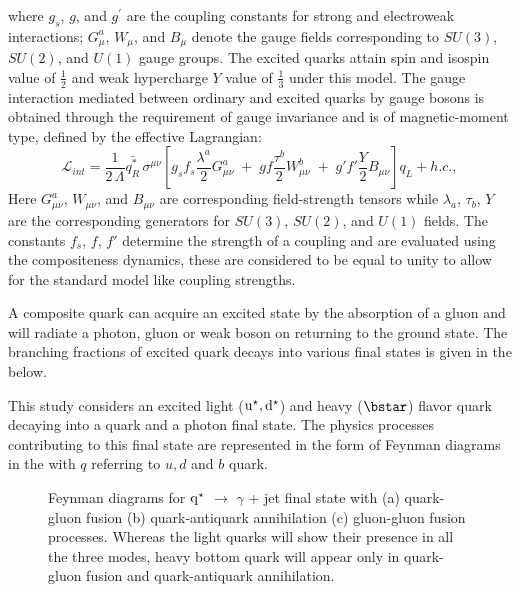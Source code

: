 where $g_{s}$, $g$, and $g^{\prime}$ are the coupling constants for strong and electroweak interactions; $G_{\mu}^{a}$, $W_{\mu}$, and $B_{\mu}$ denote
the gauge fields corresponding to $SU(3)$, $SU(2)$, and $U(1)$ gauge groups. The excited quarks attain spin and isospin value of $\frac{1}{2}$ and weak hypercharge
$Y$ value of $\frac{1}{3}$ under this model. The gauge interaction mediated between ordinary and excited quarks by gauge bosons is obtained through the
requirement of gauge invariance and is of magnetic-moment type, defined by the effective Lagrangian:
\begin{equation}
{\mathcal L}_{int} = \frac{1}{2\,\Lambda}\bar{q^{\ast}_{R}} \, \sigma^{\mu\nu}
\left[g_{s}f_{s}\frac{\lambda^{a}}{2}G^{a}_{\mu\nu}\;+\;gf\frac{\tau^{b}}{2}W_{\mu\nu}^{b}\;+\;g'f'\frac{Y}{2}B_{\mu\nu} \right] q_{L} + h.c.,
\label{eq:Lagrangian1}
\end{equation}
Here $G^{a}_{\mu\nu}$, $W_{\mu\nu}$, and $B_{\mu\nu}$ are corresponding field-strength tensors while $\lambda_{a}$, $\tau_{b}$, $Y$
are the corresponding generators for $SU(3)$, $SU(2)$, and $U(1)$ fields. The constants $f_{s}$, $f$, $f'$ determine the strength of a coupling and are
evaluated using the compositeness dynamics, these are considered to be equal to unity to allow for the standard model like coupling strengths. 

A composite quark can acquire an excited state by the absorption of a gluon and will radiate a photon, gluon or weak boson on returning to the ground state.
The branching fractions of excited quark decays into various final states is given in the \tab{\ref{Table:qstarBR}} below.

\vspace{-0.3in}

This study considers an excited light ($\mathrm{u^\star},\mathrm{d^\star}$) and heavy ($\bstar$) flavor quark decaying into a quark and a photon final state.
The physics processes contributing to this final state are represented in the form of Feynman diagrams in the \fig{\ref{fig:qstarSig}}
with $q$ referring to $u, d$ and $b$ quark.
\begin{figure}[h]
\begin{center}
\hspace{0.1 in}
\hspace{0.1 in}
\caption{Feynman diagrams for $\mathrm{q^\star}$ $\rightarrow$ $\gamma$ + jet final state with (a) quark-gluon fusion (b) quark-antiquark annihilation
  (c) gluon-gluon fusion processes. Whereas the light quarks will show their presence in all the three modes, heavy bottom quark will appear only in quark-gluon fusion and quark-antiquark annihilation.}
\label{fig:qstarSig}
\end{center}
\end{figure}
\vspace{-0.3in}

